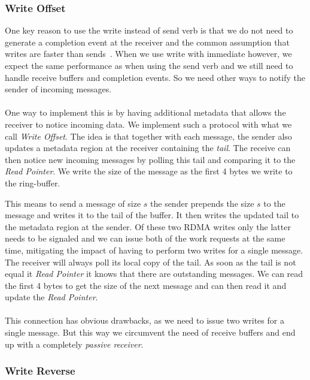 \subsubsection{Write Offset}

One key reason to use the write instead of send verb is that we do not need to generate a completion event at the receiver
and the common assumption that writes are faster than sends~\cite{herd}. When we use 
write with immediate however, we expect the same performance as when using the send verb and we still need to handle receive
buffers and completion events. So we need other ways to notify the sender of incoming messages.

\paragraph{} One way to implement this is by having additional metadata that allows the receiver to notice incoming data.
We implement such a protocol with what we call \emph{Write Offset}. The idea is that together with each message, the sender
also updates a metadata region at the receiver containing the \emph{tail}. The receive can then notice new incoming messages
by polling this tail and comparing it to the \emph{Read Pointer}. We write the size of the message as the first 4 bytes we 
write to the ring-buffer.

This means to send a message of size $s$ the sender prepends the size $s$ to the message and writes it to the
tail of the buffer. It then writes the updated tail to the metadata region at the sender. Of these two RDMA writes only the 
latter needs to be signaled and we can issue both of the work requests at the same time, mitigating the impact of having to 
perform two writes for a single message. The receiver will always poll its local copy of the tail. As soon as the tail is 
not equal it \emph{Read Pointer} it knows that there are outstanding messages. We can read the first 4 bytes to get the size
of the next message and can then read it and update the \emph{Read Pointer}.

\paragraph{} This connection has obvious drawbacks, as we need to issue two writes for a single message. But this way we 
circumvent the need of receive buffers and end up with a completely \emph{passive receiver}.

\subsubsection{Write Reverse}

